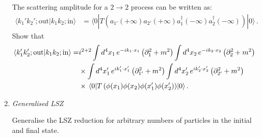 \documentclass{tutorial}
\begin{document}
\begin{enumerate}
    The scattering amplitude for a $2\rightarrow 2$ process can be
    written as: 
    \begin{align}
      \label{eq:4}
      \langle k_1' k_2';\mathrm{out} | k_1 k_2; \mathrm{in} \rangle 
      &= \langle 0 | T\left(
        a_{1'}(+\infty) a_{2'}(+\infty) 
        a_1^\dagger(-\infty) a_2^\dagger(-\infty)
        \right) |0 \rangle\, .
    \end{align}
    Show that
    \begin{align}
      \label{eq:5}
      \langle k_1' k_2';\mathrm{out} | k_1 k_2; \mathrm{in} \rangle 
      =&  i^{2+2} 
         \int d^4x_1\, e^{-i k_1\cdot x_1} \left(\partial_1^2 + m^2\right)  
         \int d^4x_2\, e^{-i k_2\cdot x_2} \left(\partial_2^2 +
         m^2\right)  \nonumber \\
      & \times \int d^4x_1'\, e^{i k_1'\cdot x_1'} \left(\partial_{1'}^2 + m^2\right)  
         \int d^4x_2'\, e^{i k_2'\cdot x_2'} \left(\partial_{2'}^2 +
        m^2\right) \nonumber \\
      & \times \expval{T\left(
        \phi(x_1) \phi(x_2) \phi(x_1') \phi(x_2')
        \right) }{0}.        
    \end{align}

\item \emph{ Generalised LSZ}

  Generalise the LSZ reduction for arbitrary numbers of particles in
  the initial and final state. 

\end{enumerate}
\end{document}
